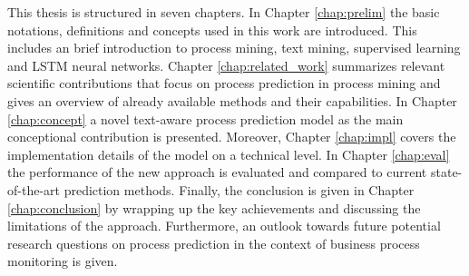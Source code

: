 This thesis is structured in seven chapters.
In Chapter \ref{chap:prelim} the basic notations, definitions and concepts used in this work are introduced.
This includes an brief introduction to process mining, text mining, supervised learning and LSTM neural networks.
Chapter \ref{chap:related_work} summarizes relevant scientific contributions that focus on process prediction in process mining and gives an overview of already available methods and their capabilities.
In Chapter \ref{chap:concept} a novel text-aware process prediction model as the main conceptional contribution is presented.
Moreover, Chapter \ref{chap:impl} covers the implementation details of the model on a technical level.
In Chapter \ref{chap:eval} the performance of the new approach is evaluated and compared to current state-of-the-art prediction methods.
Finally, the conclusion is given in Chapter \ref{chap:conclusion} by wrapping up the key achievements and discussing the limitations of the approach.
Furthermore, an outlook towards future potential research questions on process prediction in the context of business process monitoring is given.